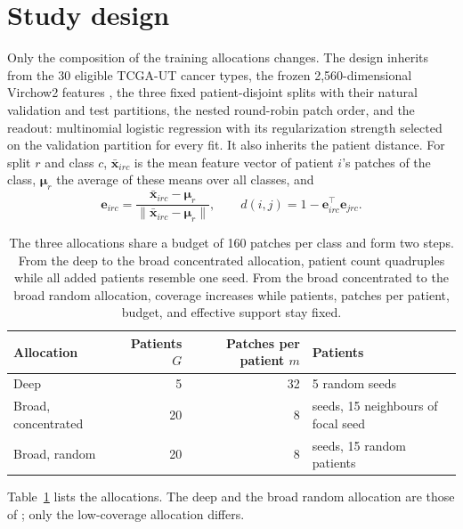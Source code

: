 \documentclass[11pt]{article}
\begin{document}
\section{Study design}
\label{sec:design}
Only the composition of the training allocations changes. The design inherits from \citet{queisler2026patientCoverage} the 30 eligible TCGA-UT cancer types, the frozen 2,560-dimensional Virchow2 features \citep{zimmermann2024virchow2}, the three fixed patient-disjoint splits with their natural validation and test partitions, the nested round-robin patch order, and the readout: multinomial logistic regression with its regularization strength selected on the validation partition for every fit. It also inherits the patient distance. For split $r$ and class $c$, $\bar{\mathbf x}_{irc}$ is the mean feature vector of patient $i$'s patches of the class, $\boldsymbol\mu_r$ the average of these means over all classes, and
\begin{equation}
 \mathbf e_{irc}=\frac{\bar{\mathbf x}_{irc}-\boldsymbol\mu_r}{\lVert\bar{\mathbf x}_{irc}-\boldsymbol\mu_r\rVert},
 \qquad
 d(i,j)=1-\mathbf e_{irc}^{\top}\mathbf e_{jrc}.
 \label{eq:distance}
\end{equation}

\begin{table}[htbp]
\centering
\renewcommand{\arraystretch}{1.15}
\begin{tabular}{@{}lrrl@{}}
\toprule
Allocation & Patients $G$ & Patches per patient $m$ & Patients \\
\midrule
Deep & 5 & 32 & 5 random seeds \\
Broad, concentrated & 20 & 8 & seeds, 15 neighbours of focal seed \\
Broad, random & 20 & 8 & seeds, 15 random patients \\
\bottomrule
\end{tabular}
\caption{The three allocations share a budget of 160 patches per class and form two steps. From the deep to the broad concentrated allocation, patient count quadruples while all added patients resemble one seed. From the broad concentrated to the broad random allocation, coverage increases while patients, patches per patient, budget, and effective support stay fixed.}
\label{tab:allocations}
\end{table}

\noindent Table~\ref{tab:allocations} lists the allocations. The deep and the broad random allocation are those of \citet{queisler2026patientCoverage}; only the low-coverage allocation differs.
\end{document}
